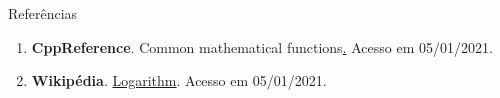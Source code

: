 \begin{frame}[fragile]{Referências}

    \begin{enumerate}
        \item \textbf{CppReference}. {Common mathematical functions}\href{https://en.cppreference.com/w/cpp/numeric/math}. Acesso em 05/01/2021.

       \item \textbf{Wikipédia}. \href{https://en.wikipedia.org/wiki/Logarithm}{Logarithm}. Acesso em 05/01/2021.
    \end{enumerate}

\end{frame}
